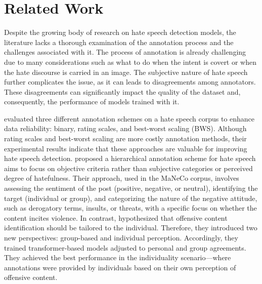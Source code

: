 \section{Related Work}
\label{sec:related-work}
Despite the growing body of research on hate speech detection models, the literature lacks a thorough examination of the annotation process and the challenges associated with it. The process of annotation is already challenging due to many considerations such as what to do when the intent is covert or when the hate discourse is carried in an image. The subjective nature of hate speech further complicates the issue, as it can leads to disagreements among annotators. These disagreements can significantly impact the quality of the dataset and, consequently, the performance of  models trained with it.

\citet{Poletto2019} evaluated three different annotation schemes on a hate speech corpus to enhance data reliability: binary, rating scales, and best-worst scaling (BWS). Although rating scales and best-worst scaling are more costly annotation methods, their experimental results indicate that these approaches are valuable for improving hate speech detection. 
%
\citet{Assimakopoulos2020} proposed a hierarchical annotation scheme for hate speech aims to  focus on objective criteria rather than subjective categories or perceived degree of hatefulness. Their approach, used in the MaNeCo corpus, involves assessing the sentiment of the post (positive, negative, or neutral), identifying the target (individual or group), and categorizing the nature of the negative attitude, such as derogatory terms, insults, or threats, with a specific focus on whether the content incites violence. 
In contrast, \citet{Kocon2021} hypothesized that offensive content identification should be tailored to the individual. Therefore, they introduced two new perspectives: group-based and individual perception. Accordingly, they trained transformer-based models adjusted to personal and group agreements. They achieved the best performance in the individuality scenario—where annotations were provided by individuals based on their own perception of offensive content.

